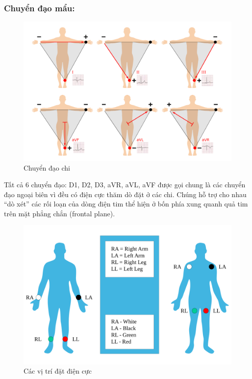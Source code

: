 \subsubsection{Chuyển đạo mẩu:}
\begin{center}
    \begin{figure}[htp]
    \begin{center}
    \includegraphics[scale=.2]{image/week1/chuyendaochi.png}
    \end{center}
    \caption[Chuyển đạo chi]{Chuyển đạo chi \cite{chuyendao}}
    \end{figure}
\end{center}
Tất cả 6 chuyển đạo: D1, D2, D3, aVR, aVL, aVF được gọi chung là các chuyển đạo ngoại biên vì đều có điện cực thăm dò đặt ở các chi. Chúng hỗ trợ cho nhau “dò xét” các rối loạn của dòng điện tim thể hiện ở bốn phía xung quanh quả tim trên mặt phẳng chắn (frontal plane).
\begin{center}
    \begin{figure}[htp]
    \begin{center}
    \includegraphics[scale=.12]{image/chapter1/2000px-Limb_leads.png}
    \end{center}
    \caption{Các vị trí đặt điện cực}
    \end{figure}
\end{center}

